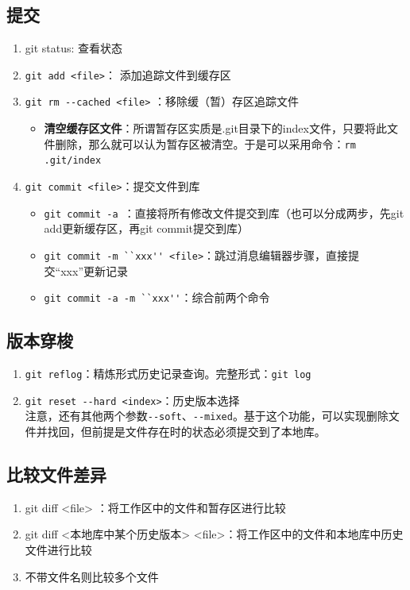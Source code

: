 \subsection{提交}
\begin{enumerate}
\item git status: 查看状态
\item \verb|git add <file>|： 添加追踪文件到缓存区 
\item  \verb|git rm --cached <file>| ：移除缓（暂）存区追踪文件
\begin{itemize}
\item \textbf{清空缓存区文件}：所谓暂存区实质是.git目录下的index文件，只要将此文件删除，那么就可以认为暂存区被清空。于是可以采用命令：\verb|rm .git/index|
\end{itemize}
\item \verb|git commit <file>|：提交文件到库
\begin{itemize}
\item \verb|git commit -a |：直接将所有修改文件提交到库（也可以分成两步，先git add更新缓存区，再git commit提交到库）
\item \verb|git commit -m ``xxx'' <file>|：跳过消息编辑器步骤，直接提交“xxx”更新记录
\item \verb|git commit -a -m ``xxx''|：综合前两个命令
\end{itemize}
\end{enumerate}



\subsection{版本穿梭}
\begin{enumerate}
\item \verb|git reflog|：精炼形式历史记录查询。完整形式：\verb|git log| 

\item \verb|git reset --hard <index>|：历史版本选择\\
注意，还有其他两个参数\verb|--soft|、\verb|--mixed|。基于这个功能，可以实现删除文件并找回，但前提是文件存在时的状态必须提交到了本地库。
\end{enumerate}



\subsection{比较文件差异}
\begin{enumerate}
\item git diff <file> ：将工作区中的文件和暂存区进行比较
\item git diff <本地库中某个历史版本> <file>：将工作区中的文件和本地库中历史文件进行比较
\item 不带文件名则比较多个文件
\end{enumerate}



